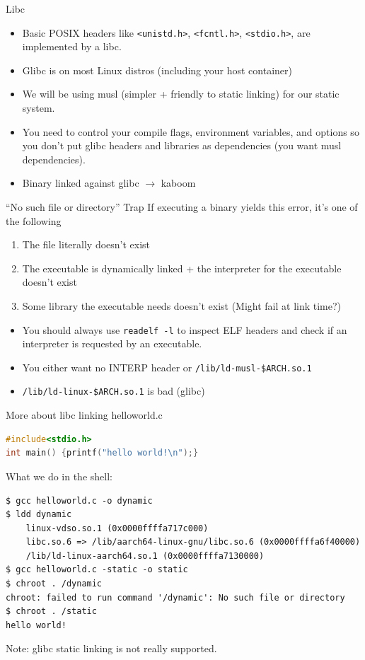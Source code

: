 \documentclass{../lecture}
\begin{document}
\begin{frame}{Libc}
  \begin{itemize}
    \item Basic POSIX headers like \texttt{<unistd.h>}, \texttt{<fcntl.h>},
      \texttt{<stdio.h>}, are implemented by a libc.
    \item Glibc is on most Linux distros (including your host container)
    \item We will be using musl (simpler + friendly to static linking) for our
      static system.
    \item You need to control your compile flags, environment variables, and
      options so you don't put glibc headers and libraries as dependencies (you
      want musl dependencies).
    \item Binary linked against glibc $\rightarrow$ kaboom
  \end{itemize}
\end{frame}

\begin{frame}{``No such file or directory'' Trap}
  If executing a binary yields this error, it's one of the following
  \begin{enumerate}
    \item The file literally doesn't exist
    \item The executable is dynamically linked + the interpreter for the executable doesn't exist
    \item Some library the executable needs doesn't exist (Might fail at link time?)
  \end{enumerate}
  \begin{itemize}
    \item You should always use \texttt{readelf -l} to inspect ELF headers and
      check if an interpreter is requested by an executable.
    \item You either want no INTERP header or \texttt{/lib/ld-musl-\$ARCH.so.1}
    \item \texttt{/lib/ld-linux-\$ARCH.so.1} is bad (glibc)
  \end{itemize}
\end{frame}

\begin{frame}[fragile]{More about libc linking}
helloworld.c
\begin{lstlisting}[language=c]
#include<stdio.h>
int main() {printf("hello world!\n");}
\end{lstlisting}
What we do in the shell:
\begin{lstlisting}
$ gcc helloworld.c -o dynamic
$ ldd dynamic
	linux-vdso.so.1 (0x0000ffffa717c000)
	libc.so.6 => /lib/aarch64-linux-gnu/libc.so.6 (0x0000ffffa6f40000)
	/lib/ld-linux-aarch64.so.1 (0x0000ffffa7130000)
$ gcc helloworld.c -static -o static
$ chroot . /dynamic
chroot: failed to run command '/dynamic': No such file or directory
$ chroot . /static
hello world!
\end{lstlisting}
Note: glibc static linking is not really supported.
\end{frame}
\end{document}
